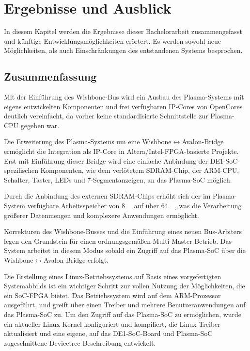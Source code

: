 \chapter{Ergebnisse und Ausblick}
\label{cha:synopsis}

In diesem Kapitel werden die Ergebnisse dieser Bachelorarbeit zusammengefasst und künftige Entwicklungsmöglichkeiten erörtert. Es werden sowohl neue Möglichkeiten, als auch Einschränkungen des entstandenen Systems besprochen. 

\section{Zusammenfassung}

Mit der Einführung des Wishbone-Bus wird ein Ausbau des Plasma-Systems mit eigens entwickelten Komponenten und frei verfügbaren IP-Cores von OpenCores deutlich vereinfacht, da vorher keine standardisierte Schnittstelle zur Plasma-\gls{CPU} gegeben war. 

Die Erweiterung des Plasma-Systems um eine Wishbone{$\leftrightarrow$}Avalon-\gls{Bridge} ermöglicht die Integration als IP-Core in Altera/Intel-\gls{FPGA}-basierte Projekte. Erst mit Einführung dieser Bridge wird eine einfache Anbindung der DE1-SoC-spezifischen Komponenten, wie dem verlötetem SDRAM-Chip, der \gls{ARM}-\gls{CPU}, Schalter, Taster, LEDs und 7-Segmentanzeigen, an das Plasma-\gls{SoC} möglich. 

Durch die Anbindung des externen SDRAM-Chips erhöht sich der im Plasma-System verfügbare Arbeitsspeicher von \SI{8}{\kilo\byte} 
auf über \SI{64}{\mega\byte}, was die Verarbeitung größerer Datenmengen und komplexere Anwendungen ermöglicht. 

Korrekturen des Wishbone-Busses und die Einführung eines neuen Bus-Arbiters legen den Grundstein für einen ordnungsgemäßen Multi-Master-Betrieb. Das System arbeitet in diesem Modus sobald ein Zugriff auf das Plasma-\gls{SoC} über die Wishbone{$\leftrightarrow$}Avalon-\gls{Bridge} erfolgt. 

Die Erstellung eines Linux-Betriebssystems auf Basis eines vorgefertigten Systemabbilds ist ein wichtiger Schritt zur vollen Nutzung der Möglichkeiten, die ein \gls{SoC}-\gls{FPGA} bietet. Das Betriebssystem wird auf dem \gls{ARM}-Prozessor ausgeführt, und greift über einen Treiber und mehrere Benutzeranwendungen auf das Plasma-\gls{SoC} zu. Um den Zugriff auf das Plasma-\gls{SoC} zu ermöglichen, wurde ein aktueller Linux-Kernel konfiguriert und kompiliert, die Linux-Treiber aktualisiert und eine eigene, auf das DE1-SoC-Board und Plasma-\gls{SoC} zugeschnittene Devicetree-Beschreibung entwickelt. 

